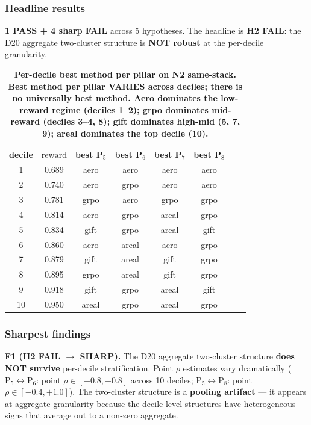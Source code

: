 \subsubsection{Headline results}\label{sec:synth-d21-results}
\textbf{1 PASS + 4 sharp FAIL} across 5 hypotheses. The headline is
\textbf{H2 FAIL}: the D20 aggregate two-cluster structure is
\textbf{NOT robust} at the per-decile granularity.

\begin{table}[h]
\centering
\small
\begin{tabular}{cccccccc}
\hline
decile & $\overline{\mathrm{reward}}$ & best P$_5$ & best P$_6$ & best P$_7$ & best P$_8$ \\
\hline
1  & 0.689 & aero & aero & aero & aero \\
2  & 0.740 & aero & grpo & aero & aero \\
3  & 0.781 & grpo & aero & grpo & grpo \\
4  & 0.814 & aero & grpo & areal & grpo \\
5  & 0.834 & gift & grpo & areal & gift \\
6  & 0.860 & aero & areal & aero & grpo \\
7  & 0.879 & gift & areal & gift & grpo \\
8  & 0.895 & grpo & areal & gift & grpo \\
9  & 0.918 & gift & grpo & areal & gift \\
10 & 0.950 & areal & grpo & areal & grpo \\
\hline
\end{tabular}
\caption{\textbf{Per-decile best method per pillar on N2 same-stack.
\textbf{Best method per pillar VARIES across deciles}; there is no
universally best method. Aero dominates the low-reward regime (deciles
1--2); grpo dominates mid-reward (deciles 3--4, 8); gift dominates
high-mid (5, 7, 9); areal dominates the top decile (10).}}
\label{tab:synth-d21-decile}
\end{table}

\subsubsection{Sharpest findings}\label{sec:synth-d21-findings}

\textbf{F1 (H2 FAIL $\rightarrow$ SHARP).}
The D20 aggregate two-cluster structure \textbf{does NOT survive}
per-decile stratification. Point $\rho$ estimates vary dramatically
($\mathrm{P}_5 \leftrightarrow \mathrm{P}_6$: point $\rho \in [-0.8, +0.8]$
across 10 deciles; $\mathrm{P}_5 \leftrightarrow \mathrm{P}_8$: point
$\rho \in [-0.4, +1.0]$). The two-cluster structure is a
\textbf{pooling artifact} --- it appears at aggregate granularity because
the decile-level structures have heterogeneous signs that average out to
a non-zero aggregate.


